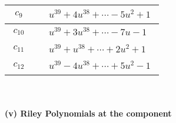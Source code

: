 \documentclass[1p]{elsarticle_modified}
\theoremstyle{definition}
\begin{document}
\begin{tabular}{m{50pt}|m{274pt}}
\hline $$\begin{aligned}c_{9}\end{aligned}$$&$\begin{aligned}
&u^{39}+4 u^{38}+\cdots-5 u^2+1
\end{aligned}$\\
\hline $$\begin{aligned}c_{10}\end{aligned}$$&$\begin{aligned}
&u^{39}+3 u^{38}+\cdots-7 u-1
\end{aligned}$\\
\hline $$\begin{aligned}c_{11}\end{aligned}$$&$\begin{aligned}
&u^{39}+u^{38}+\cdots+2 u^2+1
\end{aligned}$\\
\hline $$\begin{aligned}c_{12}\end{aligned}$$&$\begin{aligned}
&u^{39}-4 u^{38}+\cdots+5 u^2-1
\end{aligned}$\\
\hline
\end{tabular}\\~\\
\newpage\renewcommand{\arraystretch}{1}
\flushleft \textbf{(v) Riley Polynomials at the component}\newline \\
\end{document}
